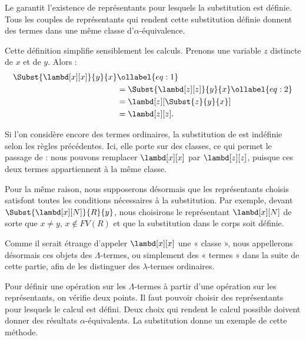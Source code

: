 \documentclass[../../../include/open-logic-section]{subfiles}
\begin{document}
Le  garantit l'existence de représentants
pour lesquels la substitution est définie. Tous les couples
de représentants qui rendent cette substitution définie
donnent des termes dans une même classe d'$\alpha$-équivalence.

Cette définition simplifie sensiblement les
calculs. Prenons une variable $z$ distincte
de $x$ et de $y$. Alors :
\begin{align}
  \Subst{\lambd[x][x]}{y}{x}
  &\ollabel{eq:1}\\
  &= \Subst{\lambd[z][z]}{y}{x}
     \ollabel{eq:2}\\
  &= \lambd[z][\Subst{z}{y}{x}]\\
  &= \lambd[z][z].
\end{align}

Si l'on considère encore des termes ordinaires,
la substitution de  est indéfinie
selon les règles précédentes. Ici, elle porte
sur des classes, ce qui permet le passage
de  : nous pouvons remplacer
$\lambd[x][x]$ par $\lambd[z][z]$, puisque
ces deux termes appartiennent à la même classe.

Pour la même raison, nous supposerons désormais
que les représentants choisis satisfont toutes
les conditions nécessaires à la substitution.
Par exemple, devant
$\Subst{\lambd[x][N]}{R}{y}$, nous choisirons
le représentant $\lambd[x][N]$ de sorte que
$x \neq y$, $x \notin FV(R)$ et que la
substitution dans le corps soit définie.

Comme il serait étrange d'appeler
$\lambd[x][x]$ une « classe », nous
appellerons désormais ces objets des
$\Lambda$-termes, ou simplement des « termes »
dans la suite de cette partie, afin de les
distinguer des $\lambda$-termes ordinaires.

Pour définir une opération sur les $\Lambda$-termes à partir
d'une opération sur les représentants, on vérifie deux points.
Il faut pouvoir choisir des représentants pour lesquels le
calcul est défini. Deux choix qui rendent le calcul possible
doivent donner des résultats $\alpha$-équivalents.
La substitution donne un exemple de cette méthode.
\end{document}
